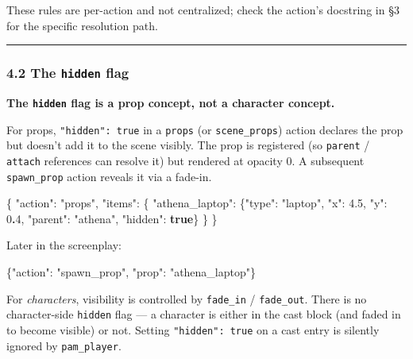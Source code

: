 \documentclass[
  12pt,
  letterpaper,
]{book}
\newenvironment{Shaded}{}{}
\newcommand{\DataTypeTok}[1]{\textcolor[rgb]{0.56,0.13,0.00}{#1}}
\newcommand{\DecValTok}[1]{\textcolor[rgb]{0.25,0.63,0.44}{#1}}
\newcommand{\ErrorTok}[1]{\textcolor[rgb]{1.00,0.00,0.00}{\textbf{#1}}}
\newcommand{\FloatTok}[1]{\textcolor[rgb]{0.25,0.63,0.44}{#1}}
\newcommand{\FunctionTok}[1]{\textcolor[rgb]{0.02,0.16,0.49}{#1}}
\newcommand{\KeywordTok}[1]{\textcolor[rgb]{0.00,0.44,0.13}{\textbf{#1}}}
\newcommand{\StringTok}[1]{\textcolor[rgb]{0.25,0.44,0.63}{#1}}
\begin{document}
These rules are per-action and not centralized; check the action's
docstring in §3 for the specific resolution path.

\begin{center}\rule{0.5\linewidth}{0.5pt}\end{center}

\subsubsection{\texorpdfstring{4.2 The \texttt{hidden}
flag}{4.2 The hidden flag}}\label{the-hidden-flag}

\textbf{The \texttt{hidden} flag is a prop concept, not a character
concept.}

For props, \texttt{"hidden":\ true} in a \texttt{props} (or
\texttt{scene\_props}) action declares the prop but doesn't add it to
the scene visibly. The prop is registered (so \texttt{parent} /
\texttt{attach} references can resolve it) but rendered at opacity 0. A
subsequent \texttt{spawn\_prop} action reveals it via a fade-in.

\begin{Shaded}
\begin{Highlighting}[]
\FunctionTok{\{}
  \DataTypeTok{"action"}\FunctionTok{:} \StringTok{"props"}\FunctionTok{,}
  \DataTypeTok{"items"}\FunctionTok{:} \FunctionTok{\{}
    \DataTypeTok{"athena\_laptop"}\FunctionTok{:} \FunctionTok{\{}\DataTypeTok{"type"}\FunctionTok{:} \StringTok{"laptop"}\FunctionTok{,} \DataTypeTok{"x"}\FunctionTok{:} \FloatTok{4.5}\FunctionTok{,} \DataTypeTok{"y"}\FunctionTok{:} \DecValTok{0}\ErrorTok{.}\DecValTok{4}\FunctionTok{,}
                      \DataTypeTok{"parent"}\FunctionTok{:} \StringTok{"athena"}\FunctionTok{,} \DataTypeTok{"hidden"}\FunctionTok{:} \KeywordTok{true}\FunctionTok{\}}
  \FunctionTok{\}}
\FunctionTok{\}}
\end{Highlighting}
\end{Shaded}

Later in the screenplay:

\begin{Shaded}
\begin{Highlighting}[]
\FunctionTok{\{}\DataTypeTok{"action"}\FunctionTok{:} \StringTok{"spawn\_prop"}\FunctionTok{,} \DataTypeTok{"prop"}\FunctionTok{:} \StringTok{"athena\_laptop"}\FunctionTok{\}}
\end{Highlighting}
\end{Shaded}

For \emph{characters}, visibility is controlled by \texttt{fade\_in} /
\texttt{fade\_out}. There is no character-side \texttt{hidden} flag ---
a character is either in the cast block (and faded in to become visible)
or not. Setting \texttt{"hidden":\ true} on a cast entry is silently
ignored by \texttt{pam\_player}.
\end{document}
